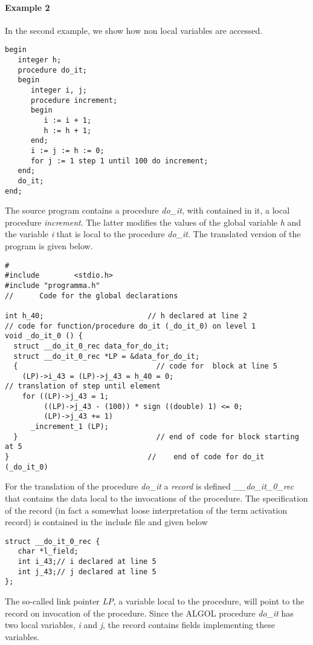 \documentclass[11pt]{article}
\begin{document}
\paragraph{Example 2}
In the second example, we show how non local variables are accessed.
{\footnotesize
\begin{verbatim}
begin
   integer h;
   procedure do_it;
   begin
      integer i, j;
      procedure increment;
      begin
         i := i + 1;
         h := h + 1;
      end;
      i := j := h := 0;
      for j := 1 step 1 until 100 do increment;
   end;
   do_it;
end;
\end{verbatim}
}

The source program contains a procedure {\em do\_it},
with contained in it, a local procedure {\em increment}.
The latter modifies the values of the global variable {\em h}
and the variable {\em i} that is local to the procedure {\em do\_it}.
The translated version of the program is given below.
{\footnotesize
\begin{verbatim}
#
#include        <stdio.h>
#include "programma.h"
//      Code for the global declarations

int h_40;                        // h declared at line 2
// code for function/procedure do_it (_do_it_0) on level 1
void _do_it_0 () {
  struct __do_it_0_rec data_for_do_it;
  struct __do_it_0_rec *LP = &data_for_do_it;
  {                                // code for  block at line 5 
    (LP)->i_43 = (LP)->j_43 = h_40 = 0;
// translation of step until element
    for ((LP)->j_43 = 1;
         ((LP)->j_43 - (100)) * sign ((double) 1) <= 0;
         (LP)->j_43 += 1)
      _increment_1 (LP);
  }                                // end of code for block starting at 5
}                                //    end of code for do_it (_do_it_0)
\end{verbatim}
}

For the translation of the procedure {\em do\_it} a {\em record} is
defined {\em \_\_do\_it\_0\_rec} that contains the data local
to the invocations of the procedure. The specification of
the record (in fact a  somewhat loose interpretation of the term
activation record) is contained in the include file and given
below
{\footnotesize
\begin{verbatim}
struct __do_it_0_rec {
   char *l_field;
   int i_43;// i declared at line 5
   int j_43;// j declared at line 5
};
\end{verbatim}
}
The so-called link pointer {\em LP}, a variable local to the procedure,
will point to the record on invocation of the procedure.
Since the ALGOL procedure {\em do\_it} has two local
variables, {\em i} and {\em j}, the record contains
fields implementing these variables.
\end{document}

